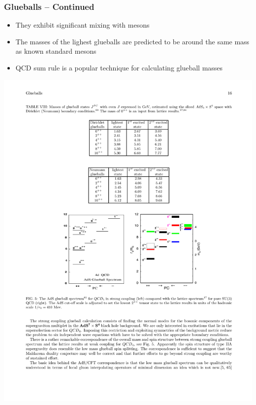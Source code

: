 \documentclass[mathserif,18pt,xcolor=table]{beamer}
\begin{document}
\begin{frame}
  \frametitle{Glueballs -- Continued}
  \begin{itemize}
  \item They exhibit significant mixing with mesons
  \item The masses of the lighest glueballs are predicted to be around the same mass as known standard mesons
  \item QCD sum rule is a popular technique for calculating glueball masses
  \end{itemize}
  \begin{center}
    \includegraphics[width=.725\linewidth]{../figures/glueballmass.pdf}
  \end{center}
\end{frame}
\end{document}
